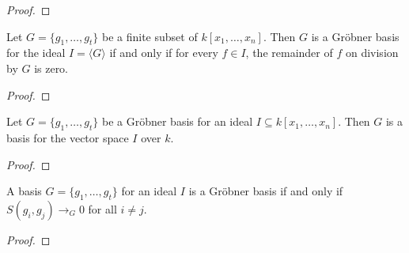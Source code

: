         \begin{proof}
          
          
        \end{proof}
        

        \begin{lemma}\label{is_groebner_basis_iff}
          \leanok
          Let \( G = \{g_1, \ldots, g_t\} \) be a finite subset of \( k[x_1, \ldots, x_n] \). Then \( G \) is a Gröbner basis for the ideal \( I = \langle G \rangle \) if and only if  for every \( f \in I \), the remainder of \( f \) on division by \( G \) is zero.

        \end{lemma}
        
        \begin{proof}
          
          
        \end{proof}
        

        \begin{lemma}\label{groebner_basis_is_basis}
          \leanok
          Let \( G = \{g_1, \ldots, g_t\} \) be a Gröbner basis for an ideal \( I \subseteq k[x_1, \ldots, x_n] \). Then \( G \) is a basis for the vector space \( I \) over \( k \).

        \end{lemma}
        
        \begin{proof}
          
          
        \end{proof}
        

        \begin{lemma}\label{buchberger_criterion}
          \leanok
          A basis \( G = \{ g_1, \ldots, g_t \} \) for an ideal \( I \) is a Gröbner basis if and only if \( S(g_i, g_j) \to_G 0 \) for all \( i \neq j \).

        \end{lemma}
        
        \begin{proof}
          
          
        \end{proof}
        

